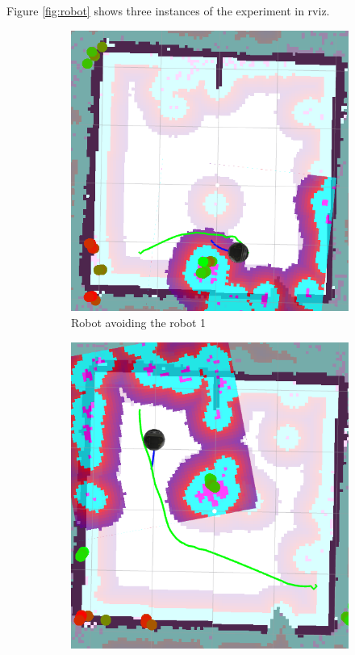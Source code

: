 Figure \ref{fig:robot} shows three instances of the experiment in rviz.
\begin{figure}[ht!]
  \centering
  \begin{subfigure}[t]{0.3\linewidth}
    \includegraphics[width=\linewidth]{imgs/chapter5/robot1.png}
     \caption{Robot avoiding the robot 1}
     \label{fig::robot1}
  \end{subfigure}
  \begin{subfigure}[t]{0.3\linewidth}
    \includegraphics[width=\linewidth]{imgs/chapter5/robot2.png}

\end{subfigure}
\end{figure}
